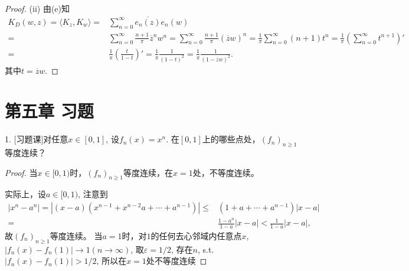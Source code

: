 \documentclass[a4paper,8pt]{ctexart}\textwidth 140mm \textheight 216mm
\newcommand{\e}{\varepsilon}
\newcommand{\8}{\infty}
\newcommand{\la}{\langle}
\newcommand{\ra}{\rangle}
\begin{document}
\begin{proof}
	(ii) 由(e)知
	\begin{equation*}
	\begin{split}
	K_D(w,z)=\la K_z,K_w\ra=&\sum_{n=0}^\infty \overline{e_n(z)}e_n(w)\\
	=&\sum_{n=0}^\infty\frac{n+1}{\pi}\overline{z}^nw^n=\sum_{n=0}^\infty\frac{n+1}{\pi}(\overline{z}w)^n=\frac{1}{\pi}\sum_{n=0}^\infty (n+1)t^n=\frac{1}{\pi}(\sum_{n=0}^\infty t^{n+1})'\\
	=&\frac{1}{\pi}\left(\frac{t}{1-t}\right)'=\frac{1}{\pi}\frac{1}{(1-t)^2}=\frac{1}{\pi}\frac{1}{(1-\overline{z}w)^2}.
	\end{split}
	\end{equation*}
	其中$t=\overline{z}w$. 
\end{proof}



\section{第五章 习题}
1. [习题课]对任意$x\in[0,1]$, 设$f_n(x)=x^n$. 在$[0,1]$上的哪些点处，$(f_n)_{n\geq 1}$等度连续？
\begin{proof}
	当$x\in[0,1)$时，$(f_n)_{n\geq 1}$等度连续，在$x=1$处，不等度连续。
	
	实际上，设$a\in[0,1)$, 注意到
	\[\begin{split}
	|x^n-a^n|=|(x-a)(x^{n-1}+x^{n-2}a+\cdots+a^{n-1})|\leq& (1+a+\cdots+a^{n-1})|x-a|\\
	=&\frac{1-a^n}{1-a}|x-a|<\frac{1}{1-a}|x-a|,
	\end{split}
	\]
	故$(f_n)_{n\geq 1}$等度连续。	
	当$a=1$时，对$1$的任何去心邻域内任意点$x$, $|f_n(x)-f_n(1)|\to 1(n\to\infty)$, 取$\e=1/2$, 存在$n$, s.t. $|f_n(x)-f_n(1)|>1/2$, 所以在$x=1$处不等度连续
\end{proof}
\end{document}
